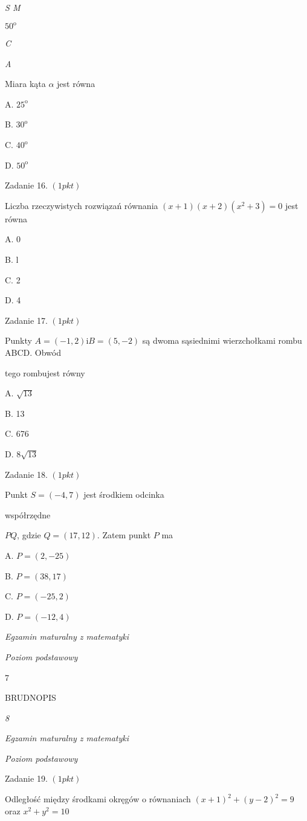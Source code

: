 \documentclass[a4paper,12pt]{article}
\begin{document}
{\it S  M}

$50^{\mathrm{o}}$

{\it C}

{\it A}

Miara kąta $\alpha$ jest równa

A. $25^{\mathrm{o}}$

B. $30^{\mathrm{o}}$

C. $40^{\mathrm{o}}$

D. $50^{\mathrm{o}}$

Zadanie 16. $(1pkt)$

Liczba rzeczywistych rozwiązań równania $(x+1)(x+2)(x^{2}+3)=0$ jest równa

A. 0

B. l

C. 2

D. 4

Zadanie 17. $(1pkt)$

Punkty $A=(-1,2) \mathrm{i}B=(5,-2)$ są dwoma sąsiednimi wierzchołkami rombu ABCD. Obwód

tego rombujest równy

A. $\sqrt{13}$

B. 13

C. 676

D. $8\sqrt{13}$

Zadanie 18. $(1pkt)$

Punkt $S=(-4,7)$ jest środkiem odcinka

współrzędne

$PQ$, gdzie $Q=(17,12)$. Zatem punkt $P$ ma

A. $P=(2,-25)$

B. $P=(38,17)$

C. $P=(-25,2)$

D. $P=(-12,4)$





{\it Egzamin maturalny z matematyki}

{\it Poziom podstawowy}

7

BRUDNOPIS





{\it 8}

{\it Egzamin maturalny z matematyki}

{\it Poziom podstawowy}

Zadanie 19. $(1pkt)$

Odległość między środkami okręgów o równaniach $(x+1)^{2}+(y-2)^{2}=9$ oraz $x^{2}+y^{2}=10$
\end{document}

